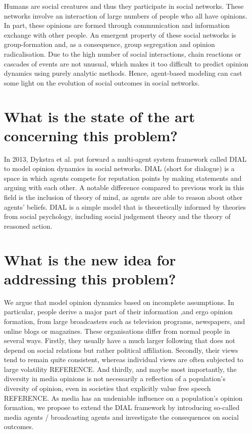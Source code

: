 Humans are social creatures and thus they participate in social networks. These networks involve an interaction of large numbers of people who all have opinions. In part, these opinions are formed through communication and information exchange with other people. An emergent property of these social networks is group-formation and, as a consequence, group segregation and opinion radicalisation. Due to the high number of social interactions, chain reactions or cascades of events are not unusual, which makes it too difficult to predict opinion dynamics using purely analytic methods. Hence, agent-based modeling can cast some light on the evolution of social outcomes in social networks.

\section{What is the state of the art concerning this problem?}
In 2013, Dykstra et al. put forward a multi-agent system framework called DIAL to model opinion dynamics in social networks. DIAL (short for dialogue) is a space in which agents compete for reputation points by making statements and arguing with each other. A notable difference compared to previous work in this field is the inclusion of theory of mind, as agents are able to reason about other agents' beliefs. DIAL is a simple model that is theoretically informed by theories from social psychology, including social judgement theory \cite{sherif&hovland1961} and the theory of reasoned action{}.

\section{What is the new idea for addressing this problem?}
We argue that \cite{dykstra2013} model opinion dynamics based on incomplete assumptions. In particular, people derive a major part of their information ,and ergo opinion formation, from large broadcasters such as television programs, newspapers, and online blogs or magazines. These organisations differ from normal people in several ways. Firstly, they usually have a much larger following that does not depend on social relations but rather political affiliation. Secondly, their views tend to remain quite consistent, whereas individual views are often subjected to large volatility {REFERENCE}. And thirdly, and maybe most importantly, the diversity in media opinions is not necessarily a reflection of a population's diversity of opinion, even in societies that explicitly value free speech {REFERENCE}. As media has an undeniable influence on a population's opinion formation, we propose to extend the DIAL framework by introducing so-called media agents / broadcasting agents and investigate the consequences on social outcomes. 

